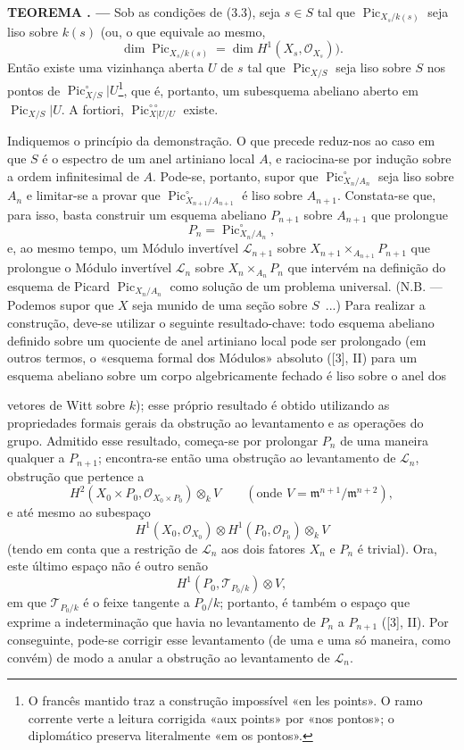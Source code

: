 \documentclass[11pt,twoside,openany]{book}
\numberwithin{equation}{section}
\newcommand{\src}[1]{%
  \phantomsection\hypertarget{src:#1}{}%
  \marginpar{\raggedleft\footnotesize\sffamily #1}%
}
\theoremstyle{plain}
\theoremstyle{definition}
\theoremstyle{remark}
\newcommand{\result}[2]{%
  \par\medskip\noindent\textbf{#1%
  \if\relax\detokenize{#2}\relax\else\space#2\fi. ---}\enspace
}
\newcommand{\FgaUnitKey}{frontmatter}
\renewcommand{\src}[1]{%
  \phantomsection\hypertarget{src:\FgaUnitKey:#1}{}%
  \marginpar{\raggedleft\footnotesize\sffamily #1}%
}
\begin{document}
\result{TEOREMA}{3.5} Sob as condições de (3.3), seja $s\in S$ tal que
$\operatorname{Pic}_{X_s/k(s)}$ seja liso sobre $k(s)$ (ou, o que equivale ao
mesmo,
\[
\dim\operatorname{Pic}_{X_s/k(s)}=\dim H^1(X_s,\mathcal O_{X_s})).
\]
Então existe uma vizinhança aberta $U$ de $s$ tal que
$\operatorname{Pic}_{X/S}$ seja liso sobre $S$ nos pontos de
$\operatorname{Pic}_{X/S}^\circ|U$\footnote{O francês mantido traz a
construção impossível «en les points». O ramo corrente verte a leitura
corrigida «aux points» por «nos pontos»; o diplomático preserva literalmente
«em os pontos».}, que é, portanto, um subesquema abeliano aberto em
$\operatorname{Pic}_{X/S}|U$. A fortiori,
$\operatorname{Pic}_{X|U/U}^{\circ\circ}$ existe.

Indiquemos o princípio da demonstração. O que precede reduz-nos ao caso em que
$S$ é o espectro de um anel artiniano local $A$, e raciocina-se por indução
sobre a ordem infinitesimal de $A$. Pode-se, portanto, supor que
$\operatorname{Pic}_{X_n/A_n}^\circ$ seja liso sobre $A_n$ e limitar-se a
provar que $\operatorname{Pic}_{X_{n+1}/A_{n+1}}^\circ$ é liso sobre
$A_{n+1}$. Constata-se que, para isso, basta construir um esquema abeliano
$P_{n+1}$ sobre $A_{n+1}$ que prolongue
\[
P_n=\operatorname{Pic}_{X_n/A_n}^\circ,
\]
e, ao mesmo tempo, um Módulo invertível $\mathcal L_{n+1}$ sobre
$X_{n+1}\times_{A_{n+1}}P_{n+1}$ que prolongue o Módulo invertível
$\mathcal L_n$ sobre $X_n\times_{A_n}P_n$ que intervém na definição do esquema
de Picard $\operatorname{Pic}_{X_n/A_n}$ como solução de um problema universal.
(N.B. --- Podemos supor que $X$ seja munido de uma seção sobre $S$~...) Para
realizar a construção, deve-se utilizar o seguinte resultado-chave: todo
esquema abeliano definido sobre um quociente de anel artiniano local pode ser
prolongado (em outros termos, o «esquema formal dos Módulos» absoluto ([3], II)
para um esquema abeliano sobre um corpo algebricamente fechado é liso sobre o
anel dos
\src{240}
vetores de Witt sobre $k$); esse próprio resultado é obtido utilizando as
propriedades formais gerais da obstrução ao levantamento e as operações do
grupo. Admitido esse resultado, começa-se por prolongar $P_n$ de uma maneira
qualquer a $P_{n+1}$; encontra-se então uma obstrução ao levantamento de
$\mathcal L_n$, obstrução que pertence a
\[
H^2(X_0\times P_0,\mathcal O_{X_0\times P_0})\otimes_k V
\qquad(\text{onde }V=\mathfrak m^{n+1}/\mathfrak m^{n+2}),
\]
e até mesmo ao subespaço
\[
H^1(X_0,\mathcal O_{X_0})\otimes
H^1(P_0,\mathcal O_{P_0})\otimes_k V
\]
(tendo em conta que a restrição de $\mathcal L_n$ aos dois fatores $X_n$ e
$P_n$ é trivial). Ora, este último espaço não é outro senão
\[
H^1(P_0,\mathcal T_{P_0/k})\otimes V,
\]
em que $\mathcal T_{P_0/k}$ é o feixe tangente a $P_0/k$; portanto, é também o
espaço que exprime a indeterminação que havia no levantamento de $P_n$ a
$P_{n+1}$ ([3], II). Por conseguinte, pode-se corrigir esse levantamento (de
uma e uma só maneira, como convém) de modo a anular a obstrução ao levantamento
de $\mathcal L_n$.
\end{document}
